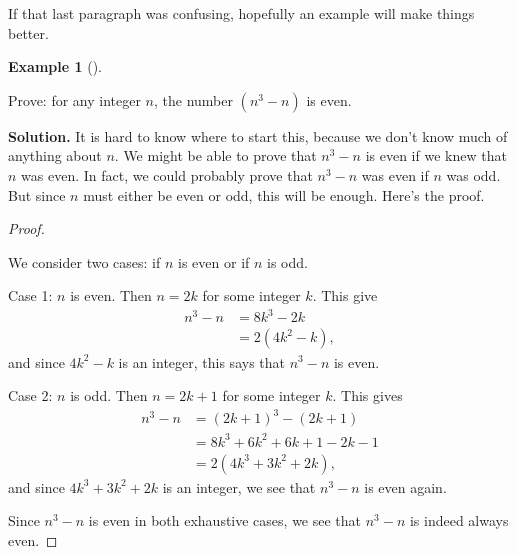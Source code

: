 \documentclass[10pt,]{book}
\theoremstyle{plain}
\theoremstyle{definition}
\newtheorem{example}[theorem]{Example}
\theoremstyle{definition}
\theoremstyle{definition}
\numberwithin{equation}{chapter}
\newcommand{\amp}{ & }
\begin{document}
If that last paragraph was confusing, hopefully an example will make things better.
%
\begin{example}[]\label{example-98}

Prove: for any integer \(n\), the number \((n^3 -n)\) is even.
%
\par\medskip\noindent%
\textbf{Solution.}\quad
It is hard to know where to start this, because we don't know much of anything about \(n\). We might be able to prove that \(n^3 - n\) is even if we knew that \(n\) was even. In fact, we could probably prove that \(n^3-n\) was even if \(n\) was odd. But since \(n\) must either be even or odd, this will be enough. Here's the proof.
%
\begin{proof}\hypertarget{proof-41}{}

We consider two cases: if \(n\) is even or if \(n\) is odd.
%
\par

Case 1: \(n\) is even. Then \(n = 2k\) for some integer \(k\). This give
\begin{align*}
  n^3 - n \amp  = 8k^3 - 2k\\
  \amp  = 2(4k^2 - k),
\end{align*}
and since \(4k^2 - k\) is an integer, this says that \(n^3-n\) is even.
%
\par

Case 2: \(n\) is odd. Then \(n = 2k+1\) for some integer \(k\). This gives
\begin{align*}
  n^3 - n \amp  = (2k+1)^3 - (2k+1)\\
  \amp  = 8k^3 + 6k^2 + 6k + 1 - 2k - 1\\
  \amp  = 2(4k^3 + 3k^2 + 2k),
\end{align*}
and since \(4k^3 + 3k^2 + 2k\) is an integer, we see that \(n^3 - n\) is even again.
%
\par

Since \(n^3 - n\) is even in both exhaustive cases, we see that \(n^3 - n\) is indeed always even.
%
\end{proof}
\end{example}
\typeout{************************************************}
\typeout{************************************************}
\end{document}
